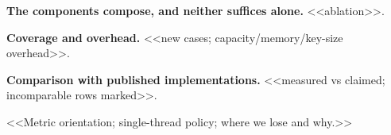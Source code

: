 \noindent\textbf{The components compose, and neither suffices alone.} <<ablation>>.

\noindent\textbf{Coverage and overhead.} <<new cases; capacity/memory/key-size overhead>>.

\noindent\textbf{Comparison with published implementations.} <<measured vs claimed; incomparable rows marked>>.

\begin{remark}
<<Metric orientation; single-thread policy; where we lose and why.>>
\end{remark}
